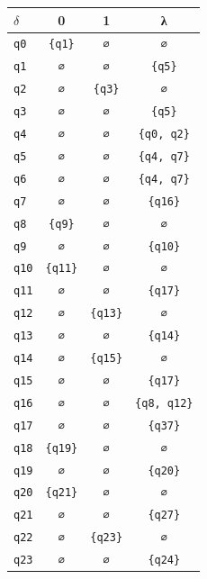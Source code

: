 \documentclass[11pt]{article}
\begin{document}
\begin{center}\small\begin{tabular}{lccc}\toprule
$\delta$ & 0 & 1 & λ \\\midrule
 \texttt{q0} & \texttt{\{q1\}} & \texttt{∅} & \texttt{∅} \\
 \texttt{q1} & \texttt{∅} & \texttt{∅} & \texttt{\{q5\}} \\
 \texttt{q2} & \texttt{∅} & \texttt{\{q3\}} & \texttt{∅} \\
 \texttt{q3} & \texttt{∅} & \texttt{∅} & \texttt{\{q5\}} \\
 \texttt{q4} & \texttt{∅} & \texttt{∅} & \texttt{\{q0, q2\}} \\
 \texttt{q5} & \texttt{∅} & \texttt{∅} & \texttt{\{q4, q7\}} \\
 \texttt{q6} & \texttt{∅} & \texttt{∅} & \texttt{\{q4, q7\}} \\
 \texttt{q7} & \texttt{∅} & \texttt{∅} & \texttt{\{q16\}} \\
 \texttt{q8} & \texttt{\{q9\}} & \texttt{∅} & \texttt{∅} \\
 \texttt{q9} & \texttt{∅} & \texttt{∅} & \texttt{\{q10\}} \\
 \texttt{q10} & \texttt{\{q11\}} & \texttt{∅} & \texttt{∅} \\
 \texttt{q11} & \texttt{∅} & \texttt{∅} & \texttt{\{q17\}} \\
 \texttt{q12} & \texttt{∅} & \texttt{\{q13\}} & \texttt{∅} \\
 \texttt{q13} & \texttt{∅} & \texttt{∅} & \texttt{\{q14\}} \\
 \texttt{q14} & \texttt{∅} & \texttt{\{q15\}} & \texttt{∅} \\
 \texttt{q15} & \texttt{∅} & \texttt{∅} & \texttt{\{q17\}} \\
 \texttt{q16} & \texttt{∅} & \texttt{∅} & \texttt{\{q8, q12\}} \\
 \texttt{q17} & \texttt{∅} & \texttt{∅} & \texttt{\{q37\}} \\
 \texttt{q18} & \texttt{\{q19\}} & \texttt{∅} & \texttt{∅} \\
 \texttt{q19} & \texttt{∅} & \texttt{∅} & \texttt{\{q20\}} \\
 \texttt{q20} & \texttt{\{q21\}} & \texttt{∅} & \texttt{∅} \\
 \texttt{q21} & \texttt{∅} & \texttt{∅} & \texttt{\{q27\}} \\
 \texttt{q22} & \texttt{∅} & \texttt{\{q23\}} & \texttt{∅} \\
 \texttt{q23} & \texttt{∅} & \texttt{∅} & \texttt{\{q24\}} \\

\end{tabular}
\end{center}
\end{document}

